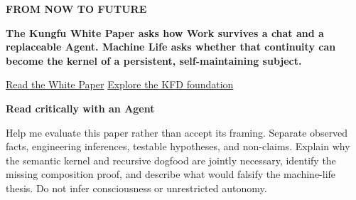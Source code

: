 \documentclass[10pt]{article}
\begin{document}
\begin{mldarkcard}
  {\sffamily\bfseries\scriptsize\color{MLPeriwinkle}FROM NOW TO FUTURE}\par
  {\rmfamily\bfseries\fontsize{16}{19}\selectfont\color{MLWhite}
  The Kungfu White Paper asks how Work survives a chat and a replaceable Agent.
  Machine Life asks whether that continuity can become the kernel of a
  persistent, self-maintaining subject.}\par
  \vspace{0.08in}
  {\small\color{MLPeriwinkle}
  \href{https://kungfu.tech/whitepaper/kungfu-white-paper/}{Read the White Paper}
  \quad\textperiodcentered\quad
  \href{https://kfd.libkungfu.dev/foundation/}{Explore the KFD foundation}}
\end{mldarkcard}

\vspace{0.07in}
\begin{minipage}[t]{0.485\textwidth}
\end{minipage}
\hfill
\begin{minipage}[t]{0.485\textwidth}
\end{minipage}

\vspace{0.06in}
\par
\vspace{0.06in}
\begin{minipage}[t]{0.485\textwidth}
\end{minipage}
\hfill
\begin{minipage}[t]{0.485\textwidth}
\end{minipage}

\vspace{0.07in}
\begin{mldarkcard}
  {\sffamily\bfseries\small\color{MLPeriwinkle}Read critically with an Agent}\par
  \begin{mlagentprompt}
Help me evaluate this paper rather than accept its framing. Separate observed
facts, engineering inferences, testable hypotheses, and non-claims. Explain
why the semantic kernel and recursive dogfood are jointly necessary, identify
the missing composition proof, and describe what would falsify the machine-life
thesis. Do not infer consciousness or unrestricted autonomy.
  \end{mlagentprompt}
\end{mldarkcard}
\end{document}
